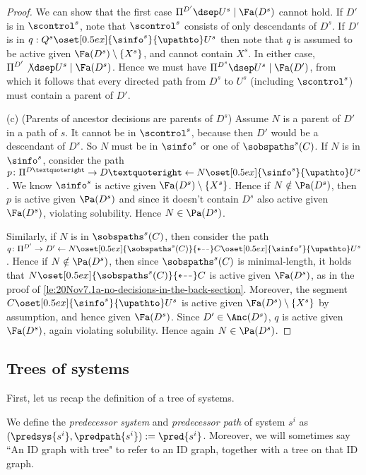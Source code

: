 \begin{proof}
We can show that the first case $\Pi^{D'} \dsep U^s \mid \Fa(D^s)$ cannot hold.
If $D'$ is in $\scontrol^s$, note that $\scontrol^s$ consists of only descendants of $D^s$. 
If $D'$ is in $q:Q^s \oset[0.5ex]{\sinfo^s}{\upathto}U^s$ then note that $q$ is assumed to be active given $\Fa(D^s) \setminus \{X^s\}$, 
and cannot contain $X^s$.
In either case, $\Pi^{D'} \not \dsep U^s \mid \Fa(D^s)$.
Hence we must have $\Pi^{D^s} \dsep U^s \mid \Fa(D')$, from which
it follows that every directed path from $D^s$ to $U^s$ (including $\scontrol^s$) must contain a parent of $D'$.

(c) (Parents of ancestor decisions are parents of $D^s$) Assume $N$ is a parent of $D'$ in a path of $s$. 
It cannot be in $\scontrol^s$, because then $D'$ would be a descendant of $D^s$.
So $N$ must be in $\sinfo^s$ or one of $\sobspaths^s(C)$.
If $N$ is in $\sinfo^s$, consider the path
$p\colon \Pi^{D’} \to D’ \leftarrow N \oset[0.5ex]{\sinfo^s}{\upathto} U^s$.
We know $\sinfo^s$ is active given $\Fa({D^s}) \setminus \{X^s\}$.
Hence if $N \notin \Pa(D^s)$, then $p$ is active given $\Pa({D^s})$ and since it doesn't contain $D^s$ also active given $\Fa(D^s)$, violating solubility. Hence $N\in \Pa(D^s)$.

Similarly, if $N$ is in $\sobspaths^s(C)$, then consider the path
$q\colon \Pi^{D'}\to D'\leftarrow N\oset[0.5ex]{\sobspaths^s(C)}{\dashleftarrow} C \oset[0.5ex]{\sinfo^s}{\upathto} U^s$.
Hence if $N \notin \Pa(D^s)$, then since $\sobspaths^s(C)$ is minimal-length, it holds that $N\oset[0.5ex]{\sobspaths^s(C)}{\dashleftarrow} C$ is active given $\Fa(D^s)$, as in the proof of \ref{le:20Nov7.1a-no-decisions-in-the-back-section}.
Moreover, the segment
$C\oset[0.5ex]{\sinfo^s}{\upathto}U^s$ is active given $\Fa(D^s)\setminus \{X^s\}$ by assumption, and hence given $\Fa(D^s)$.
Since $D' \in \Anc(D^s)$, $q$ is active given $\Fa(D^s)$, again violating solubility. Hence again $N\in \Pa(D^s)$.
\end{proof}






\subsection{Trees of systems}
First, let us recap the definition of a tree of systems.

We define the \emph{predecessor system} 
and \emph{predecessor path} of system $s^i$ 
as $(\predsys{s^i},\predpath{s^i}):=\pred{s^i}$.
Moreover, we will sometimes say ``An ID graph with tree" to refer to an ID graph, together with a tree on that ID graph.

